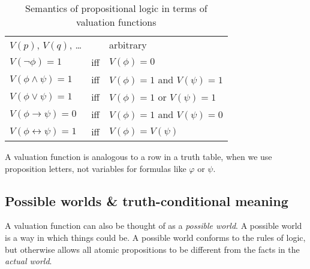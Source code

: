 \documentclass[nobib,nofonts]{tufte-handout}
\begin{document}
\begin{table}
  \centering
  \begin{tabular}{lcl}
    $V(p)$, $V(q)$, \dots && arbitrary\\
    $V(\neg \phi) = 1$ & iff & $V(\phi) =0$\\
    $V(\phi \wedge \psi) = 1$ & iff & $V(\phi) =1$ and $V(\psi) = 1$\\
    $V(\phi \vee \psi) = 1$ & iff & $V(\phi) =1$ or $V(\psi) = 1$\\
    $V(\phi \rightarrow \psi) = 0$ & iff & $V(\phi) =1$ and $V(\psi) = 0$\\
    $V(\phi \leftrightarrow \psi) = 1$ & iff & $V(\phi) = V(\psi)$
  \end{tabular}
  \caption{Semantics of propositional logic in terms of valuation functions}
  \label{tab:proplog-semantics-valuation-functions}
\end{table}

A valuation function is analogous to a row in a truth table, when we use proposition letters, not variables for formulas like $\varphi$ or \(\psi\).

\subsection{Possible worlds \& truth-conditional meaning}

A valuation function can also be thought of as a \emph{possible world}.
A possible world is a way in which things could be.
A possible world conforms to the rules of logic, but otherwise allows all atomic propositions to be different from the facts in the \emph{actual world}.
\end{document}
